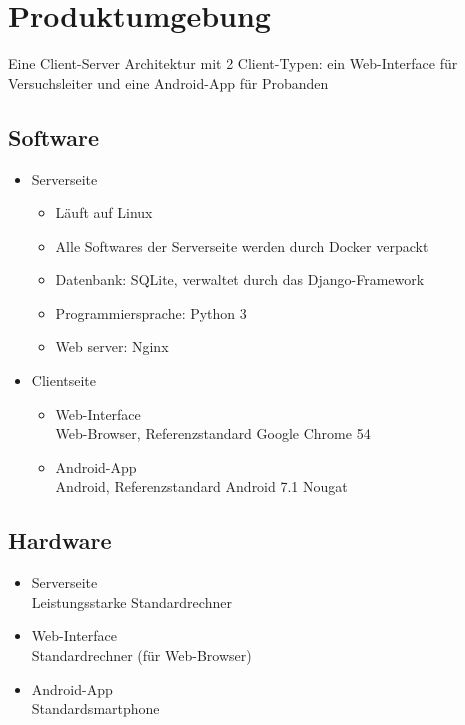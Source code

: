\documentclass[a4paper]{scrreprt}
\begin{document}
    \chapter{Produktumgebung}
        Eine Client-Server Architektur mit 2 Client-Typen: ein Web-Interface für Versuchsleiter und eine Android-App für Probanden

        \section{Software}
            \begin{itemize}
                \item Serverseite
                    \begin{itemize}
                        \item  Läuft auf Linux
                        \item Alle Softwares der Serverseite werden durch Docker verpackt
                        \item Datenbank: SQLite, verwaltet durch das Django-Framework
                        \item Programmiersprache: Python 3
                        \item Web server: Nginx
                    \end{itemize}
                \item Clientseite
                    \begin{itemize}
                        \item Web-Interface\\
                             Web-Browser, Referenzstandard Google Chrome 54
                        \item  Android-App\\
                             Android, Referenzstandard Android 7.1 Nougat
                    \end{itemize}
            \end{itemize}

        \section{Hardware}
            \begin{itemize}
                \item Serverseite\\
                    Leistungsstarke Standardrechner
                \item  Web-Interface\\
                    Standardrechner (für Web-Browser)
                \item Android-App\\
                    Standardsmartphone
            \end{itemize}
\end{document}
